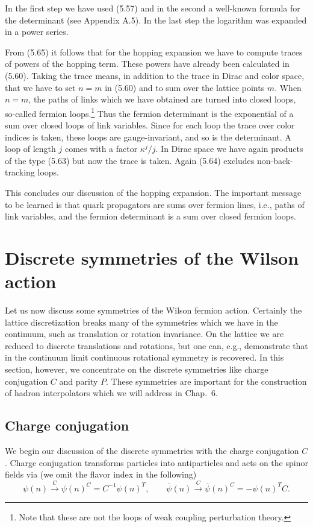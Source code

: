 In the first step we have used (5.57) and in the second a well-known formula
for the determinant (see Appendix A.5). In the last step the logarithm was
expanded in a power series.

From (5.65) it follows that for the hopping expansion we have to compute
traces of powers of the hopping term. These powers have already been calculated in (5.60). Taking the trace means, in addition to the trace in Dirac and
color space, that we have to set $n = m$ in (5.60) and to sum over the lattice
points $m$. When $n = m$, the paths of links which we have obtained are turned
into closed loops, so-called fermion loops.\footnote{Note that these are not the loops of weak coupling perturbation theory.} Thus the fermion determinant is
the exponential of a sum over closed loops of link variables. Since for each
loop the trace over color indices is taken, these loops are gauge-invariant, and
so is the determinant. A loop of length $j$ comes with a factor $\kappa^j/j$. In Dirac
space we have again products of the type (5.63) but now the trace is taken.
Again (5.64) excludes non-back-tracking loops.

This concludes our discussion of the hopping expansion. The important
message to be learned is that quark propagators are sums over fermion lines,
i.e., paths of link variables, and the fermion determinant is a sum over closed
fermion loops.

\section{Discrete symmetries of the Wilson action}

Let us now discuss some symmetries of the Wilson fermion action. Certainly
the lattice discretization breaks many of the symmetries which we have in the
continuum, such as translation or rotation invariance. On the lattice we are
reduced to discrete translations and rotations, but one can, e.g., demonstrate
that in the continuum limit continuous rotational symmetry is recovered.
In this section, however, we concentrate on the discrete symmetries like
charge conjugation $C$ and parity $P$. These symmetries are important for the
construction of hadron interpolators which we will address in Chap.~6.

\subsection{Charge conjugation}

We begin our discussion of the discrete symmetries with the charge conjugation $C$. Charge conjugation transforms particles into antiparticles and acts on
the spinor fields via (we omit the flavor index in the following)
\begin{equation}
  \psi(n) \xrightarrow{\;C\;} \psi(n)^C = C^{-1}\psi(n)^T, \qquad
  \bar{\psi}(n) \xrightarrow{\;C\;} \bar{\psi}(n)^C = -\psi(n)^T C .
\end{equation}

